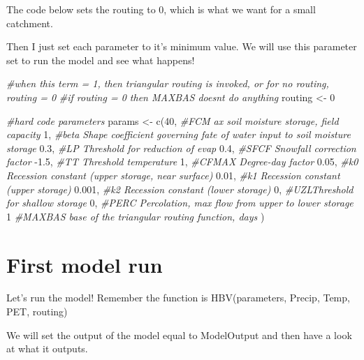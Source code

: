 \documentclass[
]{book}
\newenvironment{Shaded}{\begin{snugshade}}{\end{snugshade}}
\newcommand{\CommentTok}[1]{\textcolor[rgb]{0.56,0.35,0.01}{\textit{#1}}}
\newcommand{\DecValTok}[1]{\textcolor[rgb]{0.00,0.00,0.81}{#1}}
\newcommand{\FloatTok}[1]{\textcolor[rgb]{0.00,0.00,0.81}{#1}}
\newcommand{\FunctionTok}[1]{\textcolor[rgb]{0.00,0.00,0.00}{#1}}
\newcommand{\NormalTok}[1]{#1}
\newcommand{\OtherTok}[1]{\textcolor[rgb]{0.56,0.35,0.01}{#1}}
\newcommand{\SpecialCharTok}[1]{\textcolor[rgb]{0.00,0.00,0.00}{#1}}
\begin{document}
The code below sets the routing to 0, which is what we want for a small catchment.

Then I just set each parameter to it's minimum value. We will use this parameter set to run the model and see what happens!

\begin{Shaded}
\begin{Highlighting}[]
\CommentTok{\#when this term = 1, then triangular routing is invoked, or for no routing, routing = 0}
\CommentTok{\#if routing = 0 then MAXBAS doesn\textquotesingle{}t do anything}
\NormalTok{routing }\OtherTok{\textless{}{-}} \DecValTok{0}      

\CommentTok{\#hard code parameters }
\NormalTok{params }\OtherTok{\textless{}{-}} \FunctionTok{c}\NormalTok{(}\DecValTok{40}\NormalTok{,    }\CommentTok{\#FCM ax soil moisture storage, field capacity}
            \DecValTok{1}\NormalTok{,     }\CommentTok{\#beta Shape coefficient governing fate of water input to soil moisture storage}
            \FloatTok{0.3}\NormalTok{,   }\CommentTok{\#LP Threshold for reduction of evap}
            \FloatTok{0.4}\NormalTok{,   }\CommentTok{\#SFCF Snowfall correction factor}
            \SpecialCharTok{{-}}\FloatTok{1.5}\NormalTok{,  }\CommentTok{\#TT Threshold temperature}
            \DecValTok{1}\NormalTok{,     }\CommentTok{\#CFMAX Degree{-}day factor}
            \FloatTok{0.05}\NormalTok{,  }\CommentTok{\#k0 Recession constant (upper storage, near surface)}
            \FloatTok{0.01}\NormalTok{,  }\CommentTok{\#k1 Recession constant (upper storage)}
            \FloatTok{0.001}\NormalTok{, }\CommentTok{\#k2 Recession constant (lower storage)}
            \DecValTok{0}\NormalTok{,     }\CommentTok{\#UZLThreshold for shallow storage}
            \DecValTok{0}\NormalTok{,     }\CommentTok{\#PERC Percolation, max flow from upper to lower storage}
            \DecValTok{1}      \CommentTok{\#MAXBAS base of the triangular routing function, days}
\NormalTok{            )}
\end{Highlighting}
\end{Shaded}

\hypertarget{first-model-run}{%
\section{First model run}\label{first-model-run}}

Let's run the model! Remember the function is HBV(parameters, Precip, Temp, PET, routing)

We will set the output of the model equal to ModelOutput and then have a look at what it outputs.
\end{document}
